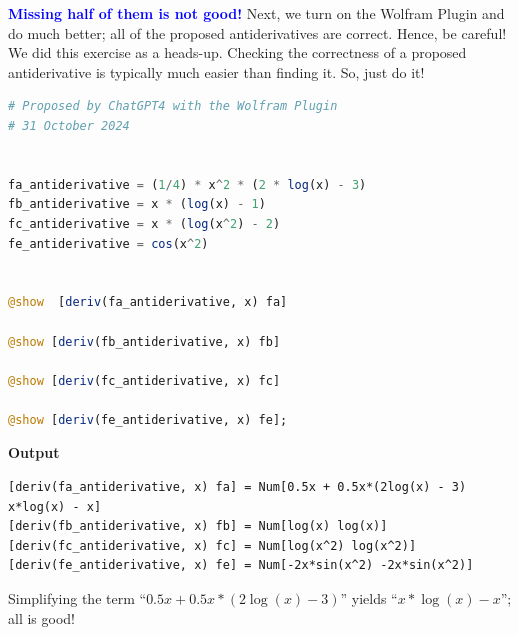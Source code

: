 \textcolor{blue}{\bf Missing half of them is not good!} Next, we turn on the Wolfram Plugin and do much better; all of the proposed antiderivatives are correct. Hence, be careful! We did this exercise as a heads-up. Checking the correctness of a proposed antiderivative is typically much easier than finding it. So, just do it!

\begin{lstlisting}[language=Julia,style=mystyle]
# Proposed by ChatGPT4 with the Wolfram Plugin
# 31 October 2024


fa_antiderivative = (1/4) * x^2 * (2 * log(x) - 3)
fb_antiderivative = x * (log(x) - 1)
fc_antiderivative = x * (log(x^2) - 2)
fe_antiderivative = cos(x^2)


@show  [deriv(fa_antiderivative, x) fa]

@show [deriv(fb_antiderivative, x) fb]

@show [deriv(fc_antiderivative, x) fc]

@show [deriv(fe_antiderivative, x) fe];
\end{lstlisting}
\textbf{Output} 
\begin{verbatim}
[deriv(fa_antiderivative, x) fa] = Num[0.5x + 0.5x*(2log(x) - 3) x*log(x) - x]
[deriv(fb_antiderivative, x) fb] = Num[log(x) log(x)]
[deriv(fc_antiderivative, x) fc] = Num[log(x^2) log(x^2)]
[deriv(fe_antiderivative, x) fe] = Num[-2x*sin(x^2) -2x*sin(x^2)]
\end{verbatim}

Simplifying the term ``$0.5x + 0.5x*(2\log(x) - 3)$'' yields ``$x*\log(x) - x$''; all is good! 
\Qed

\bigskip

